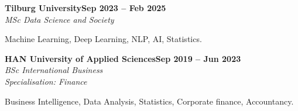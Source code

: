 \documentclass[letterpaper,10pt]{article}
\newcommand{\heading}[2]{
  \hspace{10pt}#1\hfill#2\\
}
\newcommand{\headingBf}[2]{
  \heading{\textbf{#1}}{\textbf{#2}}
}
\newcommand{\headingIt}[2]{
  \heading{\textit{#1}}{\textit{#2}}
}
\newcommand{\subheading}[2]{
  \heading{\underline{#1}}{\underline{#2}}
}
\newcommand{\subtext}[1]{
  \hspace{10pt}#1
}
\newenvironment{resume_list}{
  \vspace{-7pt}
  \begin{itemize}[itemsep=2pt, parsep=1pt, leftmargin=30pt]
}{
  \end{itemize}
}
\begin{document}
  \headingBf{Tilburg University}{Sep 2023 -- Feb 2025} %
  \headingIt{MSc Data Science and Society}{}
  \begin{resume_list}
      \item Machine Learning, Deep Learning, NLP, AI, Statistics.
  \end{resume_list}
  

  \headingBf{HAN University of Applied Sciences}{Sep 2019 -- Jun 2023} %
  \headingIt{BSc International Business}{}
  \headingIt{Specialisation: Finance}{}
  \begin{resume_list}
      \item Business Intelligence, Data Analysis, Statistics, Corporate finance, Accountancy.
  \end{resume_list}





\end{document}
